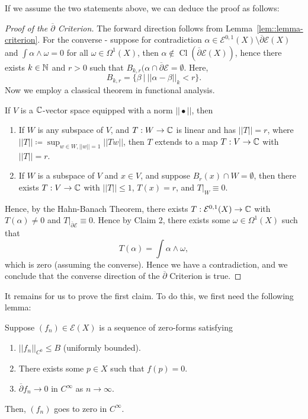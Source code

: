 \documentclass{article}
\begin{document}
{If we assume the two statements above, we can deduce the proof as follows:
\begin{proof}[Proof of the $\overline{\partial}$ Criterion]
   The forward direction follows from Lemma~\ref{lem::lemma-criterion}. For the converse - suppose for contradiction $\alpha \in \mathcal{E}^{0, 1}(X) \setminus \overline{\partial} \mathcal{E}(X)$ and $\int \alpha \wedge \omega = 0$ for all $\omega \in \Omega^1(X)$, then $\alpha \notin \operatorname{Cl}(\overline{\partial} \mathcal{E}(X))$, hence there exists $k \in \mathbb{N}$ and $r > 0$ such that $B_{k, r}(\alpha \cap \overline{\partial} \mathcal{E} = \emptyset$. Here,
    \[B_{k, r} = \{\beta\ |\ ||\alpha - \beta||_k < r\}.\]
    Now we employ a classical theorem in functional analysis.
    \begin{theorem}
        If $V$ is a $\mathbb{C}$-vector space equipped with a norm $||\bullet||$, then
        \begin{enumerate}
            \item If $W$ is any subspace of $V$, and $T: W \to \mathbb{C}$ is linear and has $||T|| = r$, where $||T|| \coloneqq \sup_{w \in W, ||w|| = 1} ||Tw||$, then $T$ extends to a map $T: V \to \mathbb{C}$ with $||T|| = r$.
            \item If $W$ is a subspace of $V$ and $x \in V$, and suppose $B_{r}(x) \cap W = \emptyset$, then there exists $T: V \to \mathbb{C}$ with $||T|| \leq 1$, $T(x) = r$, and $T|_W \equiv 0$.
        \end{enumerate}
    \end{theorem}
    Hence, by the Hahn-Banach Theorem, there exists $T: \mathcal{E}^{0, 1}(X) \to \mathbb{C}$ with $T(\alpha) \neq 0$ and $T|_{\overline{\partial} \mathcal{E}} \equiv 0$. Hence by Claim 2, there exists some $\omega \in \Omega^1(X)$ such that
    \[T(\alpha) = \int \alpha \wedge \omega, \]
    which is zero (assuming the converse). Hence we have a contradiction, and we conclude that the converse direction of the $\overline{\partial}$ Criterion is true.
\end{proof}

It remains for us to prove the first claim. To do this, we first need the following lemma:

\begin{lemma}
    Suppose $(f_n) \in \mathcal{E}(X)$ is a sequence of zero-forms satisfying
    \begin{enumerate}
        \item $||f_n||_{C^0} \leq B$ (uniformly bounded).
        \item There exists some $p \in X$ such that $f(p) = 0$.
        \item $\overline{\partial} f_n \to 0$ in $C^\infty$ as $n \to \infty$.
    \end{enumerate}
    Then, $(f_n)$ goes to zero in $C^\infty$.
\end{lemma}

}
\end{document}
